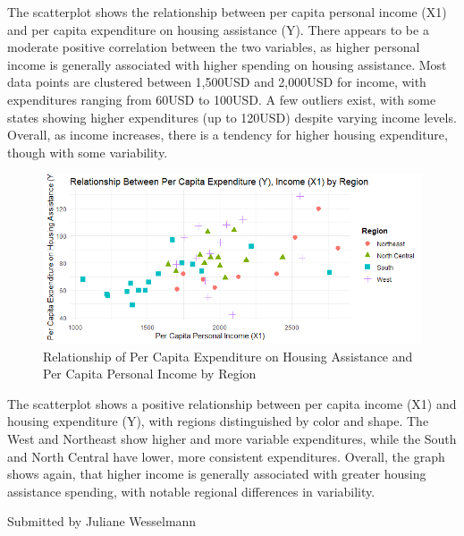 \documentclass[12pt,letterpaper]{article}
\begin{document}
\begin{itemize}
The scatterplot shows the relationship between per capita personal income (X1) and per capita expenditure on housing assistance (Y). There appears to be a moderate positive correlation between the two variables, as higher personal income is generally associated with higher spending on housing assistance. Most data points are clustered between 1,500USD and 2,000USD for income, with expenditures ranging from 60USD to 100USD. A few outliers exist, with some states showing higher expenditures (up to 120USD) despite varying income levels. Overall, as income increases, there is a tendency for higher housing expenditure, though with some variability.

  

\begin{figure}[h]
    \centering
    \includegraphics[width=\textwidth]{prettyplot.png}
    \caption{Relationship of Per Capita Expenditure on Housing Assistance and Per Capita Personal Income by Region}
    \label{fig:yourlabel}
\end{figure}

The scatterplot shows a positive relationship between per capita income (X1) and housing expenditure (Y), with regions distinguished by color and shape. The West and Northeast show higher and more variable expenditures, while the South and North Central have lower, more consistent expenditures. Overall, the graph shows again, that higher income is generally associated with greater housing assistance spending, with notable regional differences in variability.

Submitted by Juliane Wesselmann


\end{itemize}
\end{document}
